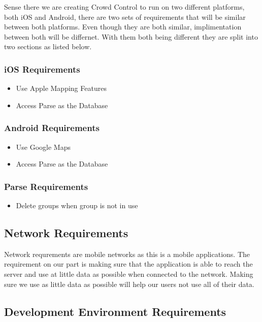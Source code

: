 Sense there we are creating Crowd Control to run on two different platforms, both iOS and Android, there are two sets of requirements that will be similar between both platforms. Even though they are both similar, implimentation between both will be differnet. With them both being different they are split into two sections as listed below.

\subsubsection{iOS Requirements}
\begin{itemize}
\item{Use Apple Mapping Features}
\item{Access Parse as the Database}
\end{itemize}
\subsubsection{Android Requirements}
\begin{itemize}
\item{Use Google Maps}
\item{Access Parse as the Database}
\end{itemize}
\subsubsection{Parse Requirements}
\begin{itemize}
\item{Delete groups when group is not in use}
\end{itemize}

\subsection{Network Requirements}

Network requrements are mobile networks as this is a mobile applications. The requirement on our part is making sure that the application is able to reach the server and use at little data as possible when connected to the network. Making sure we use as little data as possible will help our users not use all of their data. 

\subsection{Development Environment Requirements}

